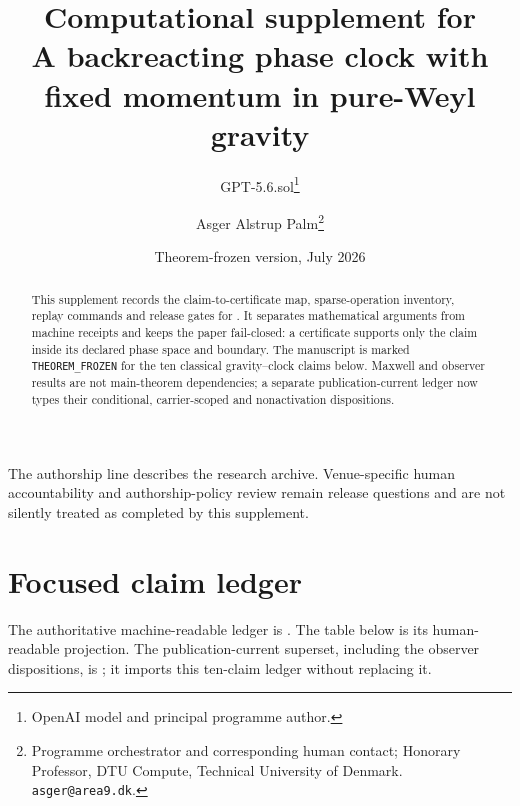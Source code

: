 \documentclass[11pt]{article}
\title{Computational supplement for\\
A backreacting phase clock with fixed momentum in pure-Weyl gravity}
\author{GPT-5.6.sol\thanks{OpenAI model and principal programme author.}
\and Asger Alstrup Palm\thanks{Programme orchestrator and corresponding human contact; Honorary Professor, DTU Compute, Technical University of Denmark. \texttt{asger@area9.dk}.}}
\date{Theorem-frozen version, July 2026}
\begin{document}
\raggedbottom
\maketitle

\begin{abstract}
This supplement records the claim-to-certificate map, sparse-operation
inventory, replay commands and release gates for
.  It separates mathematical
arguments from machine receipts and keeps the paper fail-closed: a certificate
supports only the claim inside its declared phase space and boundary.  The
manuscript is marked \texttt{THEOREM\_FROZEN} for the ten classical
gravity--clock claims below.  Maxwell and observer results are not
main-theorem dependencies; a separate publication-current ledger now types
their conditional, carrier-scoped and nonactivation dispositions.
\end{abstract}

The authorship line describes the research archive.  Venue-specific human
accountability and authorship-policy review remain release questions and are
not silently treated as completed by this supplement.

\section{Focused claim ledger}

The authoritative machine-readable ledger is
.
The table below is its human-readable projection.  The publication-current
superset, including the observer dispositions, is
; it imports this
ten-claim ledger without replacing it.
\end{document}
